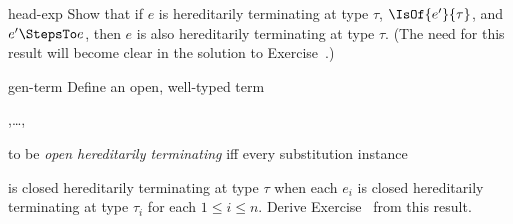 \begin{exercises}
  \begin{exercise}{head-exp}
    Show that if $e$ is hereditarily terminating at type $\tau$,
    $\IsOf{e'}{\tau}$, and $e'\StepsTo e$, then $e$ is also hereditarily
    terminating at type $\tau$.  (The need for this result will become
    clear in the solution to Exercise~.)
  \end{exercise}

  \begin{exercise}{gen-term}
    Define an open, well-typed term
    \begin{displayed*}
      ,\dots,\vdash{}
    \end{displayed*}
    to be \emph{open hereditarily terminating} iff every substitution instance
    \begin{displayed*}
    \end{displayed*}
    is closed hereditarily terminating at type $\tau$ when each $e_i$ is
    closed hereditarily terminating at type $\tau_i$ for each $1\leq i\leq n$.
    Derive Exercise~ from this result.
  \end{exercise}

\end{exercises}


